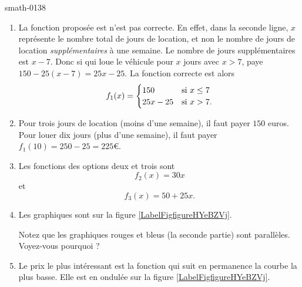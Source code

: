 
\begin{corrige}{smath-0138}

    \begin{enumerate}
        \item
            La fonction proposée est n'est pas correcte. En effet, dans la seconde ligne, \( x\) représente le nombre total de jours de location, et non le nombre de jours de location \emph{supplémentaires} à une semaine. Le nombre de jours supplémentaires est \( x-7\). Donc si qui loue le véhicule pour \( x\) jours avec \( x>7\), paye \( 150-25(x-7)=25x-25\). La fonction correcte est alors
            \begin{equation}
                f_1(x)=\begin{cases}
                    150    &   \text{si \( x\leq 7\)}\\
                    25x-25    &    \text{si \( x>7\)}.
                \end{cases}
            \end{equation}
        \item
            Pour trois jours de location (moins d'une semaine), il faut payer \( 150\) euros. Pour louer dix jours (plus d'une semaine), il faut payer \( f_1(10)=250-25=225\)€.
        \item
            Les fonctions des options deux et trois sont
            \begin{equation}
                f_2(x)=30x
            \end{equation}
            et
            \begin{equation}
                f_3(x)=50+25x.
            \end{equation}
            
        \item
            Les graphiques sont sur la figure \ref{LabelFigfigureHYeBZVj}. %
\newcommand{\CaptionFigfigureHYeBZVj}{Les prix comparés des différentes options de location pour l'exercice \ref{smath-0138}.}


Notez que les graphiques rouges et bleus (la seconde partie) sont parallèles. Voyez-vous pourquoi ?
        \item
            Le prix le plus intéressant est la fonction qui suit en permanence la courbe la plus basse. Elle est en ondulée sur la figure \ref{LabelFigfigureHYeBZVj}.

    \end{enumerate}

\end{corrige}
